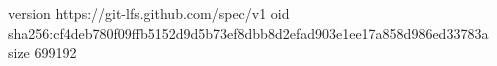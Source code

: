 version https://git-lfs.github.com/spec/v1
oid sha256:cf4deb780f09ffb5152d9d5b73ef8dbb8d2efad903e1ee17a858d986ed33783a
size 699192
